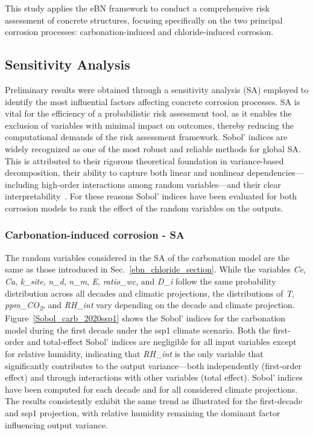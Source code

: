 
This study applies the eBN framework to conduct a comprehensive risk assessment of concrete structures, focusing specifically on the two principal corrosion processes: carbonation-induced and chloride-induced corrosion. 

\subsection{Sensitivity Analysis}
Preliminary results were obtained through a sensitivity analysis (SA) employed to identify the most influential factors affecting concrete corrosion processes.
SA is vital for the efficiency of a probabilistic risk assessment tool, as it enables the exclusion of variables with minimal impact on outcomes, thereby reducing the computational demands of the risk assessment framework.
Sobol' indices are widely recognized as one of the most robust and reliable methods for global SA. 
This is attributed to their rigorous theoretical foundation in variance-based decomposition, their ability to capture both linear and nonlinear dependencies—including high-order interactions among random variables—and their clear interpretability~\cite{Sobols_indices_SOBOL}.
For these reasons Sobol' indices have been evaluated for both corrosion models to rank the effect of the random variables on the outputs. 

\subsubsection{Carbonation-induced corrosion - SA}\label{SA_carbonation}
The random variables considered in the SA of the carbonation model are the same as those introduced in Sec.~\ref{ebn_chloride_section}. 
While the variables \textit{Ce}, \textit{Ca}, \textit{k\_site}, \textit{n\_d}, \textit{n\_m}, \textit{E}, \textit{ratio\_wc}, and \textit{D\_i} follow the same probability distribution across all decades and climatic projections, the distributions of \textit{T}, \textit{ppm\_CO\textsubscript{2}}, and \textit{RH\_int} vary depending on the decade and climate projection. \\ 
Figure~\ref{Sobol_carb_2020ssp1} shows the Sobol' indices for the carbonation model during the first decade under the ssp1 climate scenario. 
Both the first-order and total-effect Sobol' indices are negligible for all input variables except for relative humidity, indicating that \textit{RH\_int} is the only variable that significantly contributes to the output variance—both independently (first-order effect) and through interactions with other variables (total effect).
Sobol' indices have been computed for each decade and for all considered climate projections. The results consistently exhibit the same trend as illustrated for the first-decade and ssp1 projection, with relative humidity remaining the dominant factor influencing output variance. 


